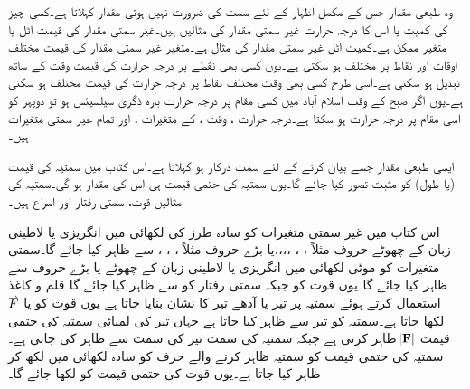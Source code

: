 وہ طبعی مقدار جس کے مکمل اظہار کے لئے سمت کی ضرورت نہیں ہوتی  مقدار کہلاتا ہے۔کسی چیز کی کمیت  یا اس کا درجہ حرارت  غیر سمتی مقدار کی مثالیں ہیں۔غیر سمتی مقدار کی قیمت اٹل یا متغیر ممکن ہے۔کمیت اٹل غیر سمتی مقدار کی مثال ہے۔متغیر غیر سمتی مقدار کی قیمت مختلف اوقات اور نقاط پر مختلف ہو سکتی ہے۔یوں کسی بھی نقطے پر درجہ حرارت کی قیمت وقت  کے ساتھ تبدیل ہو سکتی ہے۔اسی طرح کسی بھی وقت مختلف نقاط پر درجہ حرارت کی قیمت مختلف ہو سکتی ہے۔یوں اگر صبح  کے وقت اسلام آباد میں کسی مقام پر درجہ حرارت بارہ ڈگری سیلسیئس  ہو تو دوپہر کو اسی مقام پر درجہ حرارت  ہو سکتا ہے۔درجہ حرارت ، وقت ،   کے متغیرات  ،  اور  تمام غیر سمتی متغیرات ہیں۔

ایسی طبعی مقدار جسے بیان کرنے کے لئے سمت درکار ہو  کہلاتا ہے۔اس کتاب میں سمتیہ کی قیمت (یا طول) کو مثبت تصور کیا جائے گا۔یوں سمتیہ کی حتمی قیمت ہی اس کی مقدار ہو گی۔سمتیہ کی مثالیں قوت، سمتی رفتار اور اسراع  ہیں۔

اس کتاب میں غیر سمتی متغیرات کو سادہ طرز کی لکھائی میں انگریزی یا لاطینی زبان کے  چھوٹے حروف مثلاً ، ، ،،،،   یا بڑے حروف مثلاً ، ، ،   سے ظاہر کیا جائے گا۔سمتی متغیرات کو موٹی لکھائی میں انگریزی یا لاطینی زبان کے  چھوٹے  یا بڑے حروف  سے ظاہر کیا جائے گا۔یوں قوت  کو  جبکہ سمتی رفتار کو  سے ظاہر کیا جائے گا۔قلم و کاغذ استعمال کرتے ہوئے سمتیہ پر تیر  یا آدھے تیر کا نشان بنایا جاتا ہے یوں قوت کو  یا  
$\overset{\rightharpoonup}{\rule{0pt}{.9ex}\smash{F}}$
لکھا جاتا ہے۔سمتیہ کو تیر سے ظاہر کیا جاتا ہے جہاں تیر کی لمبائی سمتیہ کی حتمی قیمت $\abs{\bf{F}}$  ظاہر کرتی ہے جبکہ سمتیہ کی سمت تیر کی سمت  سے ظاہر کی جاتی ہے۔سمتیہ کی حتمی قیمت کو سمتیہ ظاہر کرنے والے حرف کو سادہ لکھائی میں لکھ کر ظاہر کیا جاتا ہے۔یوں قوت   کی حتمی قیمت  کو  لکھا جائے گا۔ 

